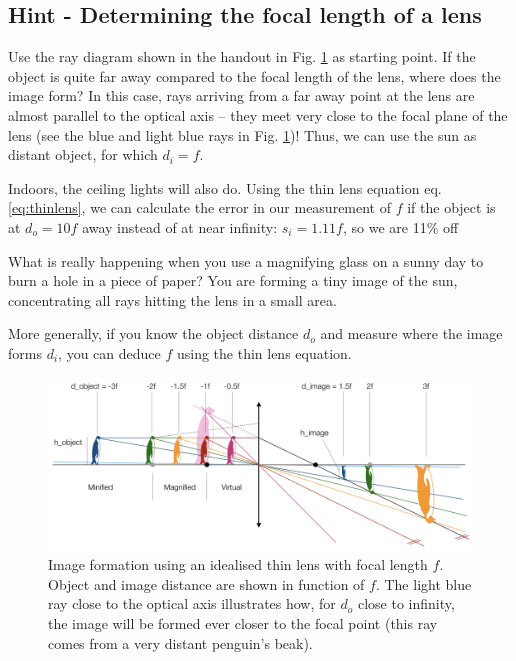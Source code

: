 \documentclass[a4paper]{report}
\begin{document}
    \clearpage
    
    
    \subsection{Hint - Determining the focal length of a lens}
	\hypertarget{hintTo-focal_length}{}
    Use the ray diagram shown in the handout in Fig. \ref{fig:imageforming} as starting point. If the object is quite far away compared to the focal length of the lens, where does the image form? In this case, rays arriving from a far away point at the lens are almost parallel to the optical axis -- they meet very close to the focal plane of the lens (see the blue and light blue rays in Fig. \ref{fig:imageforming})! Thus, we can use the sun as distant object, for which $d_i = f$. 
    
    Indoors, the ceiling lights will also do. Using the thin lens equation eq. \ref{eq:thinlens}, we can calculate the error in our measurement of $f$ if the object is at $d_o = 10f$ away instead of at near infinity: $s_i = 1.11f$, so we are 11\% off
    
    What is really happening when you use a magnifying glass on a sunny day to burn a hole in a piece of paper? You are forming a tiny image of the sun, concentrating all rays hitting the lens in a small area. 
    
    More generally, if you know the object distance $d_o$ and measure where the image forms $d_i$, you can deduce $f$ using the thin lens equation.

	\begin{figure}[h]
		\center
		\includegraphics[width=1\textwidth]{figures/penguin_lens.png}
		\captionsetup{width=0.95\textwidth}
		\caption{Image formation using an idealised thin lens with focal length $f$. Object and image distance are shown in function of $f$. 
		The light blue ray close to the optical axis illustrates how, for $d_o$ close to infinity, the image will be formed ever closer to the focal point (this ray comes from a very distant penguin's beak).
		}
		\label{fig:imageforming}
	\end{figure}
 
\end{document}
